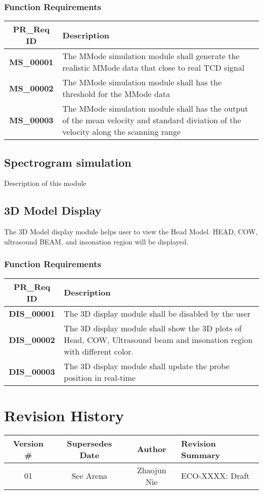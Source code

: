 \documentclass[10pt]{article}
\begin{document}
  \subsubsection {Function Requirements}
    \begin{tabularx}{\textwidth}{|c|X|}
    \hline
    \textbf{PR\_Req ID} &\textbf{Description} \\ \hline
    \textbf{MS\_00001} & The MMode simulation module shall generate the realistic MMode data that close to real TCD signal \\ \hline
    \textbf{MS\_00002} & The MMode simulation module shall has the threshold for the MMode data \\ \hline
    \textbf{MS\_00003} & The MMode simulation module shall has the output of the mean velocity and standard diviation of the velocity along the scanning range \\ \hline
 \end{tabularx} \par
  
  \subsection{Spectrogram simulation}
   Description of this module
  \subsection{3D Model Display}
  The 3D Model display module helps user to view the Head Model. HEAD, COW, ultrasound BEAM, and insonation region will be displayed.
  \subsubsection{Function Requirements}
      \begin{tabularx}{\textwidth}{|c|X|}
    \hline
    \textbf{PR\_Req ID} &\textbf{Description} \\ \hline
    \textbf{DIS\_00001} & The 3D display module shall be disabled by the user \\ \hline
    \textbf{DIS\_00002} & The 3D display module shall show the 3D plots of Head, COW, Ultrasound beam and insonation region with different color.  \\ \hline
    \textbf{DIS\_00003} & The 3D display module shall update the probe position in real-time\\ \hline
 \end{tabularx} \par

\section{Revision History}
 \begin{tabularx}{\textwidth}{|c|c|c|X|}
  \hline
  \rowcolor{lightgray} \textbf{Version \#} & \textbf{Supersedes Date} & \textbf{Author} & \textbf{Revision Summary} \\ \hline
  01 & See Arena & Zhaojun Nie & ECO-XXXX: Draft \\ \hline
 \end{tabularx}
\end{document}
